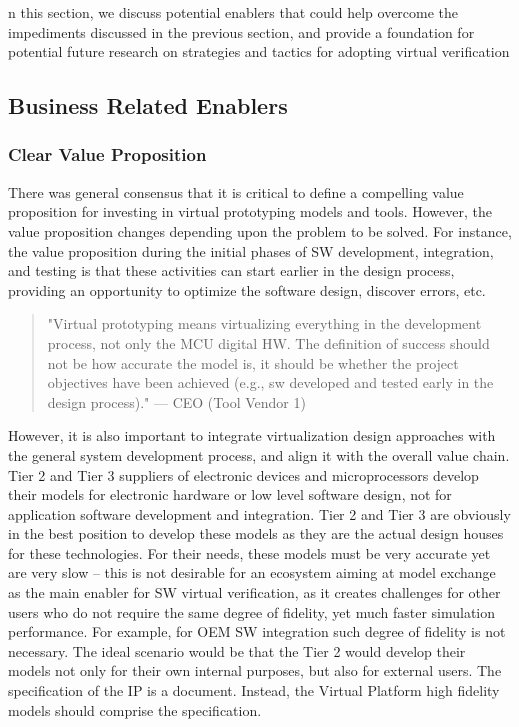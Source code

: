 n this section, we discuss potential enablers that could help overcome the impediments discussed in the previous section, and provide a foundation for potential future research on strategies and tactics for adopting virtual verification

\subsection{Business Related Enablers}
\subsubsection{Clear Value Proposition}
There was general consensus that it is critical to define a compelling value proposition for investing in virtual prototyping models and tools. However, the value proposition changes depending upon the problem to be solved. For instance, the value proposition during the initial phases of SW development, integration, and testing is that these activities can start earlier in the design process, providing an opportunity to optimize the software design, discover errors, etc.

\begin{quote}
"Virtual prototyping means virtualizing everything in the development process, not only the MCU digital HW. The definition of success should not be how accurate the model is, it should be whether the project objectives have been achieved (e.g., sw developed and tested early in the design process)."
— CEO (Tool Vendor 1)
\end{quote}

However, it is also important to integrate virtualization design approaches with the general system development process, and align it with the overall value chain.
Tier 2 and Tier 3 suppliers of electronic devices and microprocessors develop their models for electronic hardware or low level software design, not for application software development and integration. Tier 2 and Tier 3 are obviously in the best position to develop these models as they are the actual design houses for these technologies. For their needs, these models must be very accurate yet are very slow -- this is not desirable for an ecosystem aiming at model exchange as the main enabler for SW virtual verification, as it creates challenges for other users who do not require the same degree of fidelity, yet much faster simulation performance. For example, for OEM SW integration such degree of fidelity is not necessary.  The ideal scenario would be that the Tier 2 would develop their models not only for their own internal purposes, but also  for external users. The specification of the IP is a document. Instead, the Virtual Platform high fidelity models should comprise the specification. 

